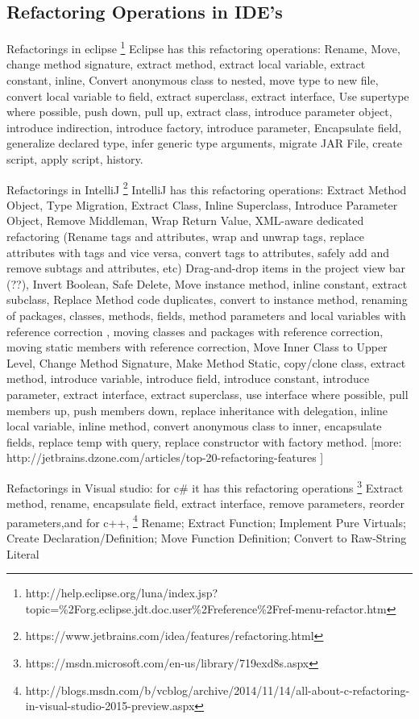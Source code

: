 \subsection{Refactoring Operations in IDE's}

Refactorings in eclipse \footnote{http://help.eclipse.org/luna/index.jsp?topic=\%2Forg.eclipse.jdt.doc.user\%2Freference\%2Fref-menu-refactor.htm}
Eclipse has this refactoring operations: Rename, Move, change method signature, extract method, extract local variable, extract constant, inline, Convert anonymous class to nested, move type to new file, convert local variable to field, extract superclass, extract interface, Use supertype where possible, push down, pull up, extract class, introduce parameter object, introduce indirection, introduce factory, introduce parameter, Encapsulate field, generalize declared type, infer generic type arguments, migrate JAR File, create script, apply script, history.


Refactorings in IntelliJ \footnote{https://www.jetbrains.com/idea/features/refactoring.html} IntelliJ has this refactoring operations: Extract Method Object, Type Migration, Extract Class, Inline Superclass, Introduce Parameter Object, Remove Middleman, Wrap Return Value, XML-aware dedicated refactoring (Rename tags and attributes, wrap and unwrap tags, replace attributes with tags and vice versa, convert tags to attributes, safely add and remove subtags and attributes, etc) Drag-and-drop items in the project view bar (??), Invert Boolean, Safe Delete, Move instance method, inline constant, extract subclass, Replace Method code duplicates, convert to instance method, renaming of packages, classes, methods, fields, method parameters and local variables with reference correction , moving classes and packages with reference correction, moving static members with reference correction, Move Inner Class to Upper Level, Change Method Signature, Make Method Static, copy/clone class, extract method, introduce variable, introduce field, introduce constant, introduce parameter, extract interface, extract superclass, use interface where possible, pull members up, push members down, replace inheritance with delegation, inline local variable, inline method, convert anonymous class to inner, encapsulate fields, replace temp with query, replace constructor with factory method. [more: http://jetbrains.dzone.com/articles/top-20-refactoring-features ]


Refactorings in Visual studio: for c\# it has this refactoring operations \footnote{https://msdn.microsoft.com/en-us/library/719exd8s.aspx} Extract method, rename, encapsulate field, extract interface, remove parameters, reorder parameters,and for c++, \footnote{http://blogs.msdn.com/b/vcblog/archive/2014/11/14/all-about-c-refactoring-in-visual-studio-2015-preview.aspx}    Rename;  Extract Function;  Implement Pure Virtuals; Create Declaration/Definition; Move Function Definition; Convert to Raw-String Literal

